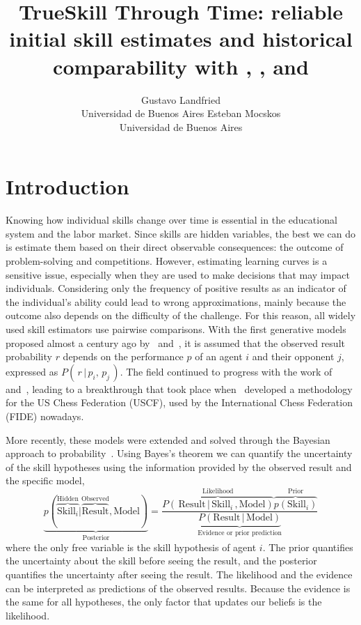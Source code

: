 \documentclass[article]{jss}
\author{Gustavo Landfried \\Universidad de Buenos Aires
\And Esteban Mocskos%
\\ 
Universidad de Buenos Aires}
\title{
TrueSkill Through Time: reliable initial skill estimates and historical comparability with \proglang{Julia}, \proglang{Python}, and \proglang{R}
}
\begin{document}

\section{Introduction} \label{sec:intro}

Knowing how individual skills change over time is essential in the educational system and the labor market. 
Since skills are hidden variables, the best we can do is estimate them based on their direct observable consequences: the outcome of problem-solving and competitions. 
However, estimating learning curves is a sensitive issue, especially when they are used to make decisions that may impact individuals. 
Considering only the frequency of positive results as an indicator of the individual's ability could lead to wrong approximations, mainly because the outcome also depends on the difficulty of the challenge. 
For this reason, all widely used skill estimators use pairwise comparisons. 
With the first generative models proposed almost a century ago by~\cite{Thurstone1927} and~\cite{Zermelo1929}, it is assumed that the observed result probability $r$ depends on the performance $p$ of an agent $i$ and their opponent $j$, expressed as $P(\, r \,|\, p_i, \, p_j \,)$. 
The field continued to progress with the work of~\cite{Bradley1952} and~\cite{Mosteller1951a,Mosteller1951b,Mosteller1951c}, leading to a breakthrough that took place when~\cite{Elo2008} developed a methodology for the US Chess Federation (USCF), used by the International Chess Federation (FIDE) nowadays. 


More recently, these models were extended and solved through the Bayesian approach to probability~\cite{glickman2001, Herbrich2007}.
%
Using Bayes's theorem we can quantify the uncertainty of the skill hypotheses using the information provided by the observed result and the specific model,
%
\begin{equation}\label{eq:event_inference}
 \underbrace{p(\overbrace{\text{Skill$_i$}}^{\text{Hidden}}|\overbrace{\text{Result}}^{\text{Observed}}, \text{Model})}_{\text{Posterior}} = \frac{\overbrace{P(\,\text{Result}\,|\,\text{Skill$_i$}\,,\text{Model})}^{\text{Likelihood}}\overbrace{p(\text{Skill$_i$})}^{\text{Prior}}}{\underbrace{P(\text{Result}\,|\,\text{Model})}_{\text{Evidence or prior prediction}}}
\end{equation}
%
where the only free variable is the skill hypothesis of agent $i$.
The prior quantifies the uncertainty about the skill before seeing the result, and the posterior quantifies the uncertainty after seeing the result.
The likelihood and the evidence can be interpreted as predictions of the observed results.
Because the evidence is the same for all hypotheses, the only factor that updates our beliefs is the likelihood.
\end{document}
